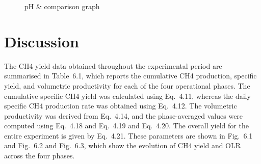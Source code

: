 \documentclass[12pt, a4paper, oneside]{report}
\begin{document}
\begin{figure}[H]
    \centering
    \begingroup
    \endgroup
    \caption{pH \&  comparison graph}
    
\end{figure}

\clearpage{}
\clearpage{}\chapter{Discussion}

The CH4 yield data obtained throughout the experimental period are summarised in Table 6.1, which reports the cumulative CH4 production, specific yield, and volumetric productivity for each of the four operational phases. The cumulative specific CH4 yield was calculated using Eq. 4.11, whereas the daily specific CH4 production rate was obtained using Eq. 4.12. The volumetric productivity was derived from Eq. 4.14, and the phase-averaged values were computed using Eq. 4.18 and Eq. 4.19 and Eq. 4.20. The overall yield for the entire experiment is given by Eq. 4.21. These parameters are shown in Fig. 6.1 and Fig. 6.2 and Fig. 6.3, which show the evolution of CH4 yield and OLR across the four phases.
\end{document}
